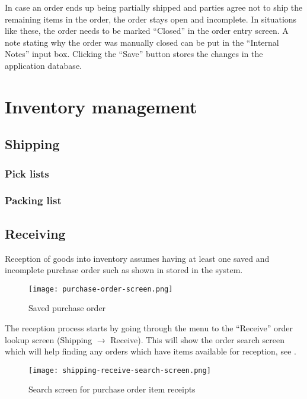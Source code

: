 In case an order ends up being partially shipped and parties agree not to ship the remaining
items in the order, the order stays open and incomplete. In situations like these, the order
needs to be marked ``Closed'' in the order entry screen. A note stating why the order was manually
closed can be put in the ``Internal Notes'' input box. Clicking the ``Save'' button stores the
changes in the application database.


\chapter{Inventory management}
\label{cha:InventoryManagement}

\section{Shipping}

\subsection{Pick lists}

\subsection{Packing list}

\section{Receiving}
\label{sec:Receiving}


Reception of goods into inventory assumes having at least one
saved and incomplete purchase order such as shown in
 stored in the system.

\begin{figure}[h]
\centering
\texttt{[image: purchase-order-screen.png]}
\caption{Saved purchase order}
\label{fig:purchase-order-screen}
\end{figure}

The reception process starts by going through the menu to the
``Receive'' order lookup screen (Shipping $\rightarrow$ Receive).
This will show the order search screen which will help finding
any orders which have items available for reception, see .


\begin{figure}[h]
\centering
\texttt{[image: shipping-receive-search-screen.png]}
\caption{Search screen for purchase order item receipts}
\label{fig:shipping-receive-search-screen}
\end{figure}

